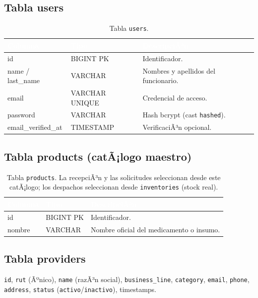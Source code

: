 ﻿\documentclass[a4paper, 12pt]{article}
\begin{document}
\subsection{Tabla users}
\begin{table}[H]
\centering
\begin{tabularx}{\textwidth}{|l|l|X|}
\hline
\rowcolor{ucsblue} \textcolor{white}{\textbf{Columna}} & \textcolor{white}{\textbf{Tipo}} & \textcolor{white}{\textbf{DescripciÃ³n}} \\ \hline
id & BIGINT PK & Identificador. \\ \hline
name / last\_name & VARCHAR & Nombres y apellidos del funcionario. \\ \hline
email & VARCHAR UNIQUE & Credencial de acceso. \\ \hline
password & VARCHAR & Hash bcrypt (cast \texttt{hashed}). \\ \hline
email\_verified\_at & TIMESTAMP & VerificaciÃ³n opcional. \\ \hline
\end{tabularx}
\caption{Tabla \texttt{users}.}
\end{table}

\subsection{Tabla products (catÃ¡logo maestro)}
\begin{table}[H]
\centering
\begin{tabularx}{\textwidth}{|l|l|X|}
\hline
\rowcolor{ucsblue} \textcolor{white}{\textbf{Columna}} & \textcolor{white}{\textbf{Tipo}} & \textcolor{white}{\textbf{DescripciÃ³n}} \\ \hline
id & BIGINT PK & Identificador. \\ \hline
nombre & VARCHAR & Nombre oficial del medicamento o insumo. \\ \hline
\end{tabularx}
\caption{Tabla \texttt{products}. La recepciÃ³n y las solicitudes seleccionan desde este catÃ¡logo; los despachos seleccionan desde \texttt{inventories} (stock real).}
\end{table}

\subsection{Tabla providers}
\texttt{id}, \texttt{rut} (Ãºnico), \texttt{name} (razÃ³n social), \texttt{business\_line}, \texttt{category}, \texttt{email}, \texttt{phone}, \texttt{address}, \texttt{status} (\texttt{activo}/\texttt{inactivo}), timestamps.
\end{document}
